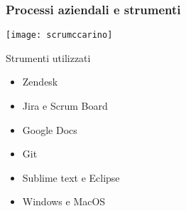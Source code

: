 \begin{frame}
\frametitle{Processi aziendali e strumenti}
\begin{minipage}[c]{.55\textwidth}
\centering 
\texttt{[image: scrumccarino]}
\end{minipage}
\begin{minipage}[c]{.35\textwidth}
Strumenti utilizzati
\begin{itemize}
\item Zendesk
\item Jira e Scrum Board
\item Google Docs
\item Git
\item Sublime text e Eclipse
\item Windows e MacOS
\end{itemize}
\end{minipage}
\end{frame}
